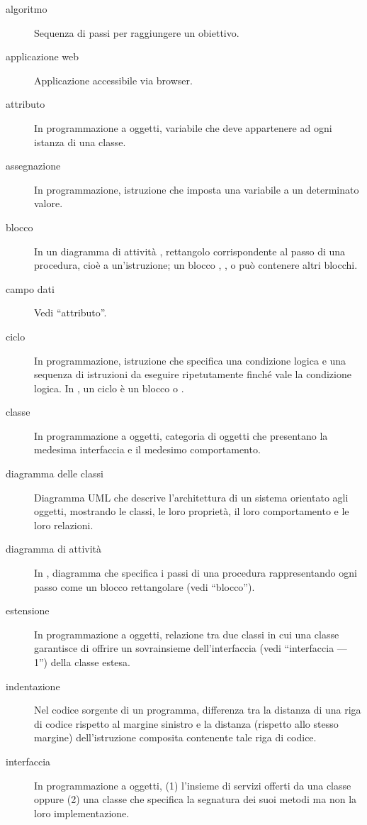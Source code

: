\begin{description}
	\item[algoritmo] Sequenza di passi per raggiungere un obiettivo.
	\item[applicazione web] Applicazione accessibile via browser.
	\item[attributo] In programmazione a oggetti, variabile che deve appartenere ad ogni istanza di una classe.
	\item[assegnazione] In programmazione, istruzione che imposta una variabile a un determinato valore.
	\item[blocco] In un diagramma di attività \proj, rettangolo corrispondente al passo di una procedura, cioè a un'istruzione; un blocco , ,  o  può contenere altri blocchi.
	\item[campo dati] Vedi “attributo”.
	\item[ciclo] In programmazione, istruzione che specifica una condizione logica e una sequenza di istruzioni da eseguire ripetutamente finché vale la condizione logica. In \proj, un ciclo è un blocco  o .
	\item[classe] In programmazione a oggetti, categoria di oggetti che presentano la medesima interfaccia e il medesimo comportamento.
	\item[diagramma delle classi] Diagramma UML che descrive l'architettura di un sistema orientato agli oggetti, mostrando le classi, le loro proprietà, il loro comportamento e le loro relazioni.
	\item[diagramma di attività] In \proj, diagramma che specifica i passi di una procedura rappresentando ogni passo come un blocco rettangolare (vedi “blocco”).
	\item[estensione] In programmazione a oggetti, relazione tra due classi in cui una classe garantisce di offrire un sovrainsieme dell'interfaccia (vedi “interfaccia --- 1”) della classe estesa.
	\item[indentazione] Nel codice sorgente di un programma, differenza tra la distanza di una riga di codice rispetto al margine sinistro e la distanza (rispetto allo stesso margine) dell'istruzione composita contenente tale riga di codice.
	\item[interfaccia] In programmazione a oggetti, (1) l'insieme di servizi offerti da una classe oppure (2) una classe che specifica la segnatura dei suoi metodi ma non la loro implementazione.

\end{description}
